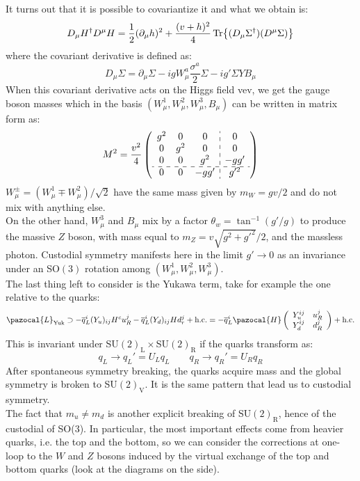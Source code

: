 \documentclass[../main.tex]{subfiles}
\begin{document}
It turns out that it is possible to covariantize it and what we obtain is:
\[
D_\mu H^\dagger D^\mu H=\frac{1}{2}(\partial_\mu h)^2+\frac{(v+h)^2}{4}\Tr{(D_\mu\Sigma^\dagger)(D^\mu\Sigma)}
\]
where the covariant derivative is defined as:
\[
D_\mu\Sigma=\partial_\mu\Sigma-igW_\mu^a\frac{\sigma^a}{2}\Sigma-ig'\Sigma YB_\mu
\]
When this covariant derivative acts on the Higgs field vev, we get the gauge boson masses which in the basis $(W_\mu^1,W_\mu^2,W_\mu^3,B_\mu)$ can be written in matrix form as:
\[
M^2=\frac{v^2}{4}\left(\begin{array}{ccc:c}
g^2 & 0 & 0 & 0 \\
0 & g^2 & 0 & 0 \\
0 & 0 & g^2 & -gg' \\
\hdashline
0 & 0 & -gg' & g'^2
\end{array}\right)
\]
$W_\mu^\pm=(W_\mu^1\mp W_\mu^2)/\sqrt{2}$ have the same mass given by $m_W=gv/2$ and do not mix with anything else.\\
On the other hand, $W_\mu^3$ and $B_\mu$ mix by a factor $\theta_w=\tan^{-1}(g'/g)$ to produce the massive $Z$ boson, with mass equal to $m_Z=v\sqrt{g^2+g'^2}/2$, and the massless photon. Custodial symmetry manifests here in the limit $g'\to0$ as an invariance under an SO$(3)$ rotation among $(W_\mu^1,W_\mu^2,W_\mu^3)$.\\
The last thing left to consider is the Yukawa term, take for example the one relative to the quarks:
\[
\pazocal{L}_{\text{Yuk}}\supset-\overline{q}_L^i(Y_u)_{ij}H^cu_R^j-\overline{q}_L^i(Y_d)_{ij}Hd_r^j+\text{h.c.}=-\overline{q}_L^i\pazocal{H}\left(\begin{array}{cc}
    Y_u^{ij} & u_R^j \\
    Y_d^{ij} & d_R^j
\end{array}\right)+\text{h.c.}
\]
This is invariant under SU$(2)_{\text{L}}\times$SU$(2)_{\text{R}}$ if the quarks transform as:
\[
q_L\to q_L'=U_Lq_L \qquad q_R\to q_R'=U_Rq_R
\]
After spontaneous symmetry breaking, the quarks acquire mass and the global symmetry is broken to SU$(2)_{\text{V}}$. It is the same pattern that lead us to custodial symmetry.\\
The fact that $m_u\neq m_d$ is another explicit breaking of SU$(2)_{\text{R}}$, hence of the custodial of SO(3). In particular, the most important effects come from heavier quarks, i.e. the top and the bottom, so we can consider the corrections at one-loop to the $W$ and $Z$ bosons induced by the virtual exchange of the top and bottom quarks (look at the diagrams on the side).\\
\end{document}
